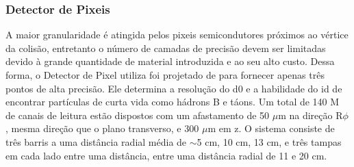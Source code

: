 \begin{table}
\centering
{}
\caption[Parâmetros do ID]
{Parâmetros do ID. As resoluções estão citadas em valores típicos (a
resolução verdadeira em cada detector depende do ângulo de impacto). Adaptado de
\cite{ATLAS_TDR}.}
\label{tab:info_id}
\end{table}

\subsubsection{Detector de Pixeis}
\label{sssec:pixeis}

A maior granularidade é atingida pelos pixeis semicondutores próximos
ao vértice da colisão, entretanto o número de camadas de precisão devem ser
limitadas devido à grande quantidade de material introduzida e ao seu alto
custo. Dessa forma, o Detector de Pixel utiliza foi projetado de para
fornecer apenas três pontos de alta precisão. Ele determina a resolução do
\gls{d0} e a habilidade do \gls{id} de encontrar partículas de curta
vida como hádrons B e táons. Um total de 140 M de canais de
leitura estão dispostos com um afastamento de 50 $\mu$m na direção R$\phi$, 
mesma direção que o plano transverso, e 300 $\mu$m em z. 
O sistema consiste de três barris a uma distância radial
média de $\sim$5 cm, 10 cm, 13 cm, e três tampas em cada lado entre uma
distância, entre uma distância radial de 11 e 20 cm.

